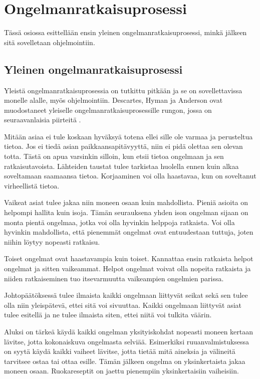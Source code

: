 \section{Ongelmanratkaisuprosessi}

Tässä osiossa esittellään ensin yleinen ongelmanratkaisuprosessi, minkä jälkeen
sitä sovelletaan ohjelmointiin.

\subsection{Yleinen ongelmanratkaisuprosessi}

Yleistä ongelmanratkaisuprosessia on tutkittu pitkään ja se on sovellettavissa
monelle alalle, myös ohjelmointiin. Descartes, Hyman ja Anderson ovat
muodostaneet yleiselle ongelmanratkaisuprosessille rungon, jossa on
seuraavanlaisia piirteitä \cite{Gries:1974:WTI:953057.810447}.

Mitään asiaa ei tule koskaan hyväksyä totena ellei sille ole varmaa ja
perusteltua tietoa. Jos ei tiedä asian paikkaansapitävyyttä, niin ei pidä
olettaa sen olevan totta. Tästä on apua varsinkin silloin, kun etsii tietoa
ongelmaan ja sen ratkaisutavoista. Lähteiden taustat tulee tarkistaa huolella
ennen kuin alkaa soveltamaan saamaansa tietoa. Korjaaminen voi olla haastavaa,
kun on soveltanut virheellistä tietoa.

Vaikeat asiat tulee jakaa niin moneen osaan kuin mahdollista. Pieniä asioita on
helpompi hallita kuin isoja. Tämän seurauksena yhden ison ongelman sijaan on
monta pientä ongelmaa, jotka voi olla hyvinkin helppoja ratkaista. Voi olla
hyvinkin mahdollista, että pienemmät ongelmat ovat entuudestaan tuttuja, joten
niihin löytyy nopeasti ratkaisu.

Toiset ongelmat ovat haastavampia kuin toiset. Kannattaa ensin ratkaista helpot
ongelmat ja sitten vaikeammat. Helpot ongelmat voivat olla nopeita ratkaista ja
niiden ratkaiseminen tuo itsevarmuutta vaikeampien ongelmien parissa.

Johtopäätöksessä tulee ilmaista kaikki ongelmaan liittyvät seikat sekä sen tulee
olla niin yleispätevä, ettei sitä voi sivuuttaa. Kaikki ongelmaan liittyvät
asiat tulee esitellä ja ne tulee ilmaista siten, ettei niitä voi tulkita väärin.

Aluksi on tärkeä käydä kaikki ongelman yksityiskohdat nopeasti moneen kertaan
lävitse, jotta kokonaiskuva ongelmasta selviää. Esimerkiksi ruuanvalmistuksessa
on syytä käydä kaikki vaiheet lävitse, jotta tietää mitä aineksia ja välineitä
tarvitsee ostaa tai ottaa esille. Tämän jälkeen ongelma on yksinkertaista jakaa
moneen osaan. Ruokareseptit on jaettu pienempiin yksinkertaisiin vaiheisiin.

